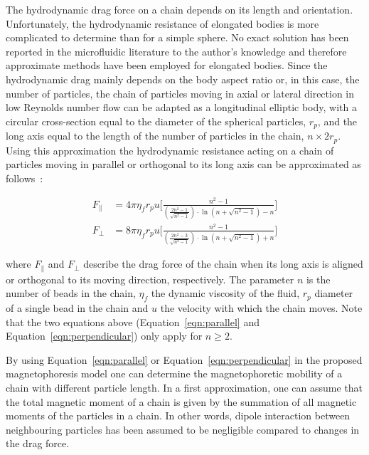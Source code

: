 The hydrodynamic drag force on a chain depends on its length and orientation. Unfortunately, the hydrodynamic resistance of elongated bodies is more complicated to determine than for a simple sphere. No exact solution has been reported in the microfluidic literature to the author's knowledge and therefore approximate methods have been employed for elongated bodies. Since the hydrodynamic drag mainly depends on the body aspect ratio or, in this case, the number of particles, the chain of particles moving in axial or lateral direction in low Reynolds number flow can be adapted as a longitudinal elliptic body, with a circular cross-section equal to the diameter of the spherical particles, $r_{p}$, and the long axis equal to the length of the number of particles in the chain, $n \times 2r_{p}$. Using this approximation the hydrodynamic resistance acting on a chain of particles moving in parallel or orthogonal to its long axis can be approximated as follows~\cite{Happel2012,Kasper1985}:

\begin{align}
	F_{\|} &= 4\pi\eta_{f} r_{p} u \Biggl[ \frac{n^{2}-1}{\left(\frac{2n^{2}-1}{\sqrt{n^{2}-1}}\right) \cdot \ln \left( n + \sqrt{n^{2}-1}\right)-n} \Biggr] \label{eqn:parallel}\\
	F_{\bot} &= 8\pi\eta_{f} r_{p} u \Biggl[ \frac{n^{2}-1}{\left(\frac{2n^{2}-3}{\sqrt{n^{2}-1}}\right)\cdot \ln \left( n + \sqrt{n^{2}-1}\right)+n} \Biggr] \label{eqn:perpendicular}
\end{align}

where $F_{\|}$ and $F_{\bot}$ describe the drag force of the chain when its long axis is aligned or orthogonal to its moving direction, respectively. The parameter $n$ is the number of beads in the chain, $\eta_{f}$ the dynamic viscosity of the fluid, $r_{p}$ diameter of a single bead in the chain and $u$ the velocity with which the chain moves. Note that the two equations above (Equation~\ref{eqn:parallel} and Equation~\ref{eqn:perpendicular}) only apply for $n \geq 2$.

By using Equation~\ref{eqn:parallel} or Equation~\ref{eqn:perpendicular} in the proposed magnetophoresis model one can determine the magnetophoretic mobility of a chain with different particle length. In a first approximation, one can assume that the total magnetic moment of a chain is given by the summation of all magnetic moments of the particles in a chain. In other words, dipole interaction between neighbouring particles has been assumed to be negligible compared to changes in the drag force.

